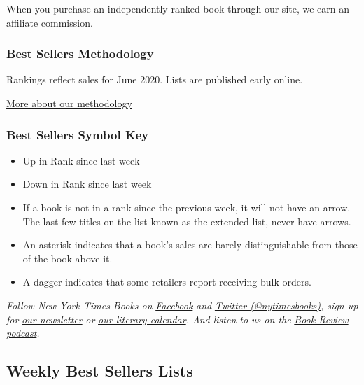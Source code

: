 When you purchase an independently ranked book through our site, we earn
an affiliate commission.

\hypertarget{best-sellers-methodology}{%
\subsubsection{Best Sellers
Methodology}\label{best-sellers-methodology}}

Rankings reflect sales for June 2020. Lists are published early online.

\href{/books/best-sellers/methodology/}{More about our methodology}

\hypertarget{best-sellers-symbol-key}{%
\subsubsection{Best Sellers Symbol Key}\label{best-sellers-symbol-key}}

\begin{itemize}
\item
  Up in Rank since last week
\item
  Down in Rank since last week
\item
  If a book is not in a rank since the previous week, it will not have
  an arrow. The last few titles on the list known as the extended list,
  never have arrows.
\item
  An asterisk indicates that a book's sales are barely distinguishable
  from those of the book above it.
\item
  A dagger indicates that some retailers report receiving bulk orders.
\end{itemize}

\emph{Follow New York Times Books on}
\href{https://www.facebookcorewwwi.onion/nytbooks/}{\emph{Facebook}}
\emph{and} \href{https://twitter.com/nytimesbooks}{\emph{Twitter
(@nytimesbooks)}}\emph{, sign up for}
\href{https://www.nytimes3xbfgragh.onion/newsletters/books-review}{\emph{our
newsletter}} \emph{or}
\href{https://www.nytimes3xbfgragh.onion/interactive/2017/books/books-calendar.html}{\emph{our
literary calendar}}\emph{. And listen to us on the}
\href{https://www.nytimes3xbfgragh.onion/column/book-review-podcast}{\emph{Book
Review podcast}}\emph{.}

\hypertarget{weekly-best-sellers-lists}{%
\subsection{Weekly Best Sellers Lists}\label{weekly-best-sellers-lists}}


